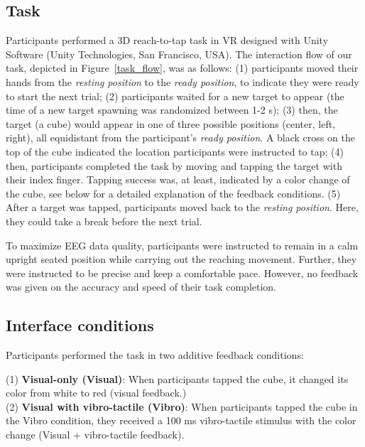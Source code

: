 \subsection{Task}
Participants performed a 3D reach-to-tap task in VR designed with Unity Software (Unity Technologies, San Francisco, USA). The interaction flow of our task, depicted in Figure~\ref{task_flow}, was as follows: (1) participants moved their hands from the \textit{resting position} to the \textit{ready position}, to indicate they were ready to start the next trial; (2) participants waited for a new target to appear (the time of a new target spawning was randomized between 1-2 s); (3) then, the target (a cube) would appear in one of three possible positions (center, left, right), all equidistant from the participant's \textit{ready position}. A black cross on the top of the cube indicated the location participants were instructed to tap;
(4) then, participants completed the task by moving and tapping the target with their index finger. Tapping success was, at least, indicated by a color change of the cube, see below for a detailed explanation of the feedback conditions. (5) After a target was tapped, participants moved back to the \textit{resting position}. Here, they could take a break before the next trial.

To maximize EEG data quality, participants were instructed to remain in a calm upright seated position while carrying out the reaching movement. Further, they were instructed to be precise and keep a comfortable pace. However, no feedback was given on the accuracy and speed of their task completion.

\subsection{Interface conditions}
Participants performed the task in two additive feedback conditions:

(1) \textbf{Visual-only (Visual)}: When participants tapped the cube, it changed its color from white to red (visual feedback.)\\
\indent(2) \textbf{Visual with vibro-tactile (Vibro)}: When participants tapped the cube in the Vibro condition, they received a 100 ms vibro-tactile stimulus with the color change (Visual + vibro-tactile feedback).

